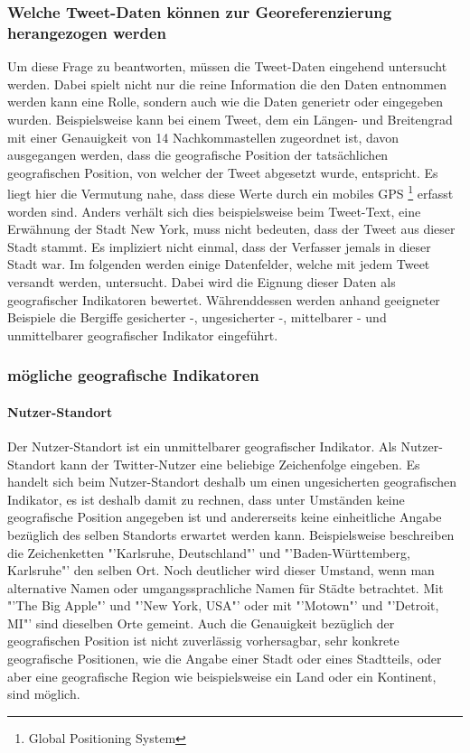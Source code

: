 		 		\subsubsection{Welche Tweet-Daten können zur Georeferenzierung herangezogen werden}  

					Um diese Frage zu beantworten, müssen die Tweet-Daten eingehend untersucht werden. 
					Dabei spielt nicht nur die reine Information die den Daten entnommen werden kann eine Rolle, sondern auch wie die Daten generietr oder eingegeben wurden.
					Beispielsweise kann bei einem Tweet, dem ein Längen- und Breitengrad mit einer Genauigkeit von 14 Nachkommastellen zugeordnet ist, davon ausgegangen werden, dass die geografische Position der tatsächlichen geografischen Position, von welcher der Tweet abgesetzt wurde, entspricht. 
					Es liegt hier die Vermutung nahe, dass diese Werte durch ein mobiles GPS \footnote{Global Positioning System} erfasst worden sind. 
					Anders verhält sich dies beispielsweise beim Tweet-Text, eine Erwähnung der Stadt New York, muss nicht bedeuten, dass der Tweet aus dieser Stadt stammt. 
					Es impliziert nicht einmal, dass der Verfasser jemals in dieser Stadt war.  
					Im folgenden werden einige Datenfelder, welche mit jedem Tweet versandt werden, untersucht.
					Dabei wird die Eignung dieser Daten als geografischer Indikatoren bewertet.
					Währenddessen werden anhand geeigneter Beispiele die Bergiffe gesicherter -, ungesicherter -, mittelbarer - und unmittelbarer geografischer Indikator eingeführt.  

				\subsubsection{mögliche geografische Indikatoren} 

					\paragraph{Nutzer-Standort} 
						
						Der Nutzer-Standort ist ein unmittelbarer geografischer Indikator.  
						Als Nutzer-Standort kann der Twitter-Nutzer eine beliebige Zeichenfolge eingeben. 
						Es handelt sich beim Nutzer-Standort deshalb um einen ungesicherten geografischen Indikator, es ist deshalb damit zu rechnen, dass unter Umständen keine geografische Position angegeben ist und andererseits keine einheitliche Angabe bezüglich des selben Standorts erwartet werden kann.
						Beispielsweise beschreiben die Zeichenketten "'Karlsruhe, Deutschland"' und "'Baden-Württemberg, Karlsruhe"' den selben Ort.
						Noch deutlicher wird dieser Umstand, wenn man alternative Namen oder umgangssprachliche Namen für Städte betrachtet. 
						Mit "'The Big Apple"' und "'New York, USA"' oder mit "'Motown"' und "'Detroit, MI"' sind dieselben Orte gemeint.   
						Auch die Genauigkeit bezüglich der geografischen Position ist nicht zuverlässig vorhersagbar, sehr konkrete geografische Positionen, wie die Angabe einer Stadt oder eines Stadtteils, oder aber eine geografische Region wie beispielsweise ein Land oder ein Kontinent, sind möglich. 


